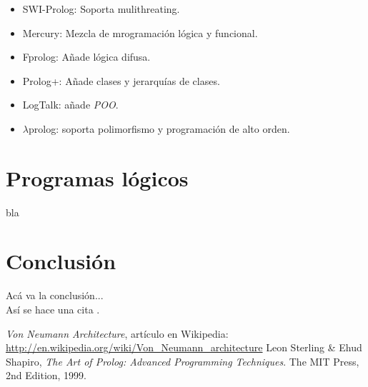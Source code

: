 \documentclass[12pt,titlepage]{article}
\begin{document}
\begin{itemize}
    \item SWI-Prolog: Soporta mulithreating.
    \item Mercury: Mezcla de mrogramación lógica y funcional.
    \item Fprolog: Añade lógica difusa.
    \item Prolog+: Añade clases y jerarquías de clases.
    \item LogTalk: añade \textit{POO}.
    \item $\lambda$prolog: soporta polimorfismo y programación de alto orden.
\end{itemize}

\newpage
\section{Programas lógicos}
bla

\newpage
\section{Conclusión}
Acá va la conclusión... \\
Así se hace una cita \cite{artofprolog}.
	
\clearpage
\begin{thebibliography}{9}
     \emph{Von Neumann Architecture}, artículo en Wikipedia: \url{http://en.wikipedia.org/wiki/Von\_Neumann\_architecture}
     Leon Sterling \& Ehud Shapiro, \emph{The Art of Prolog: Advanced Programming Techniques}. The MIT Press, 2nd Edition, 1999.
\end{thebibliography}

\end{document}
